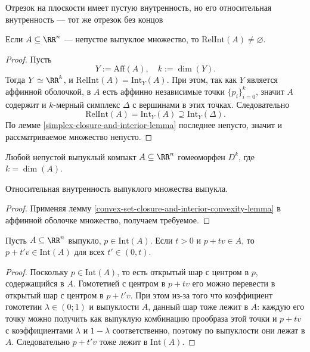\documentclass[12pt,a4paper]{article}
\newcommand{\Int}{\ensuremath{\mathrm{Int}}\xspace}
\newcommand{\Aff}{\ensuremath{\mathrm{Aff}}\xspace}
\newcommand{\RelInt}{\ensuremath{\mathrm{RelInt}}\xspace}
\begin{document}
    \begin{example}
        Отрезок на плоскости имеет пустую внутренность, но его относительная внутренность --- тот же отрезок без концов
    \end{example}

    \begin{theorem}
        Если $A \subseteq \RR^n$ --- непустое выпуклое множество, то $\RelInt(A) \neq \varnothing$.
    \end{theorem}

    \begin{proof}
        Пусть
        \[Y := \Aff(A), \quad k := \dim(Y).\]
        Тогда $Y \simeq \RR^k$, и $\RelInt(A) = \Int_Y(A)$. При этом, так как $Y$ является аффинной оболочкой, в $A$ есть аффинно независимые точки $\{p_i\}_{i=0}^{k}$, значит $A$ содержит и $k$-мерный симплекс $\Delta$ с вершинами в этих точках. Следовательно
        \[\RelInt(A) = \Int_Y(A) \supseteq \Int_Y(\Delta).\]
        По лемме \ref{simplex-closure-and-interior-lemma} последнее непусто, значит и рассматриваемое множество непусто.
    \end{proof}

    \begin{corollary}
        Любой непустой выпуклый компакт $A \subseteq \RR^n$ гомеоморфен $D^k$, где $k = \dim(A)$.
    \end{corollary}

    \begin{lemma}
        Относительная внутренность выпуклого множества выпукла.
    \end{lemma}

    \begin{proof}
        Применяя лемму \ref{convex-set-closure-and-interior-convexity-lemma} в аффинной оболочке множество, получаем требуемое.
    \end{proof}

    \begin{lemma}\label{convex-set-interior-belonging-criterion-lemma}
        Пусть $A \subseteq \RR^n$ выпукло, $p \in \Int(A)$. Если $t > 0$ и $p + tv \in A$, то $p + t'v \in \Int(A)$ для всех $t' \in (0, t)$.
    \end{lemma}

    \begin{proof}
        Поскольку $p \in \Int(A)$, то есть открытый шар с центром в $p$, содержащийся в $A$. Гомотетией с центром в $p + tv$ его можно перевести в открытый шар с центром в $p+t'v$. При этом из-за того что коэффициент гомотетии $\lambda \in (0; 1)$ и выпуклости $A$, данный шар тоже лежит в $A$: каждую его точку можно получить как выпуклую комбинацию прообраза этой точки и $p + tv$ с коэффициентами $\lambda$ и $1-\lambda$ соответственно, поэтому по выпуклости они лежат в $A$. Следовательно $p + t'v$ тоже лежит в $\Int(A)$.
    \end{proof}
\end{document}
